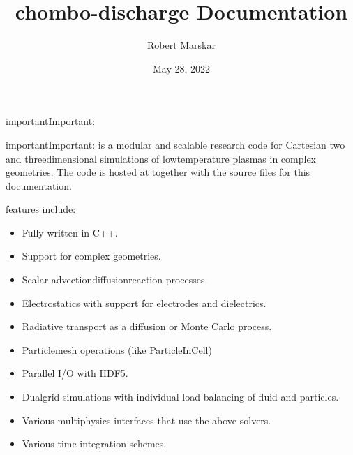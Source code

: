 \documentclass[letterpaper,10pt,english]{sphinxmanual}
\title{chombo-discharge Documentation}
\date{May 28, 2022}
\author{Robert Marskar}
\begin{document}
\pagestyle{empty}
\sphinxmaketitle
\pagestyle{plain}
\sphinxtableofcontents
\pagestyle{normal}
\label{\detokenize{index::doc}}
\begin{sphinxadmonition}{important}{Important:}
\sphinxAtStartPar
{}
\end{sphinxadmonition}



\begin{sphinxadmonition}{important}{Important:}
\sphinxAtStartPar
{} is a modular and scalable research code for Cartesian two\sphinxhyphen{} and three\sphinxhyphen{}dimensional simulations of low\sphinxhyphen{}temperature plasmas in complex geometries.
The code is hosted at  together with the source files for this documentation.
\end{sphinxadmonition}

\sphinxAtStartPar
{} features include:
\begin{itemize}
\item {} 
\sphinxAtStartPar
Fully written in C++.

\item {} 
\sphinxAtStartPar
Support for complex geometries.

\item {} 
\sphinxAtStartPar
Scalar advection\sphinxhyphen{}diffusion\sphinxhyphen{}reaction processes.

\item {} 
\sphinxAtStartPar
Electrostatics with support for electrodes and dielectrics.

\item {} 
\sphinxAtStartPar
Radiative transport as a diffusion or Monte Carlo process.

\item {} 
\sphinxAtStartPar
Particle\sphinxhyphen{}mesh operations (like Particle\sphinxhyphen{}In\sphinxhyphen{}Cell)

\item {} 
\sphinxAtStartPar
Parallel I/O with HDF5.

\item {} 
\sphinxAtStartPar
Dual\sphinxhyphen{}grid simulations with individual load balancing of fluid and particles.

\item {} 
\sphinxAtStartPar
Various multi\sphinxhyphen{}physics interfaces that use the above solvers.

\item {} 
\sphinxAtStartPar
Various time integration schemes.

\end{itemize}
\end{document}
